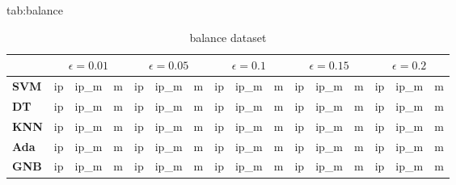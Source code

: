 \begin{table}[htbp]
\scriptsize
\floatconts
  {tab:balance}%
  {\caption{balance dataset}}%
  {
\begin{tabular}{cl|lll|lll|lll|lll|lll}
             && \multicolumn{3}{c|}{$\epsilon=0.01$} & \multicolumn{3}{c|}{$\epsilon=0.05$} & \multicolumn{3}{c|}{$\epsilon=0.1$} & \multicolumn{3}{c|}{$\epsilon=0.15$} & \multicolumn{3}{c}{$\epsilon=0.2$} \\
\hline
\hline
\hline

\hline
\multicolumn{2}{l|}{\textbf{SVM}} & ip         & ip\_m      & m          & ip         & ip\_m      & m          & ip         & ip\_m      & m          & ip         & ip\_m      & m          & ip         & ip\_m      & m           \\
\hline

\hline
\hline
\hline

\hline
\multicolumn{2}{l|}{\textbf{DT}}  & ip         & ip\_m      & m          & ip         & ip\_m      & m          & ip         & ip\_m      & m          & ip         & ip\_m      & m          & ip         & ip\_m      & m           \\
\hline

\hline
\hline
\hline

\hline
\multicolumn{2}{l|}{\textbf{KNN}} & ip         & ip\_m      & m          & ip         & ip\_m      & m          & ip         & ip\_m      & m          & ip         & ip\_m      & m          & ip         & ip\_m      & m           \\
\hline

\hline
\hline
\hline

\hline
\multicolumn{2}{l|}{\textbf{Ada}} & ip         & ip\_m      & m          & ip         & ip\_m      & m          & ip         & ip\_m      & m          & ip         & ip\_m      & m          & ip         & ip\_m      & m           \\
\hline

\hline
\hline
\hline

\hline
\multicolumn{2}{l|}{\textbf{GNB}} & ip         & ip\_m      & m          & ip         & ip\_m      & m          & ip         & ip\_m      & m          & ip         & ip\_m      & m          & ip         & ip\_m      & m           \\
\hline

\hline
\hline
\hline


\end{tabular}}
\end{table}
